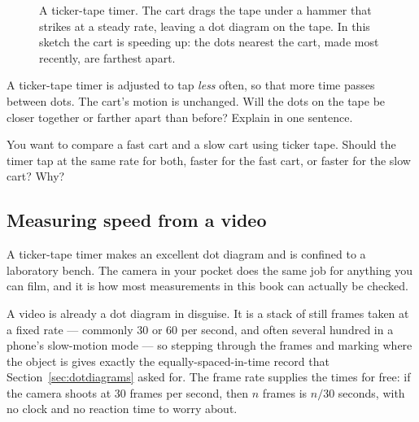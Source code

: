 \documentclass[11pt,twoside,openany]{book}
\newcounter{check}[chapter]
\begin{document}
\begin{figure}[htb]
\centering
{}
\caption{A ticker-tape timer. The cart drags the tape under a hammer that strikes at a steady rate, leaving a dot diagram on the tape. In this sketch the cart is speeding up: the dots nearest the cart, made most recently, are farthest apart.}
\label{fig:ticker}
\end{figure}

\begin{checkbox}
A ticker-tape timer is adjusted to tap \emph{less} often, so that more time passes between dots. The cart's motion is unchanged. Will the dots on the tape be closer together or farther apart than before? Explain in one sentence.
\end{checkbox}

\begin{checkbox}
You want to compare a fast cart and a slow cart using ticker tape. Should the timer tap at the same rate for both, faster for the fast cart, or faster for the slow cart? Why?
\end{checkbox}

\subsection{Measuring speed from a video}
\label{sec:video}

A ticker-tape timer makes an excellent dot diagram and is confined to a laboratory bench. The camera in your pocket does the same job for anything you can film, and it is how most measurements in this book can actually be checked.

A video is already a dot diagram in disguise. It is a stack of still frames taken at a fixed rate --- commonly \num{30} or \num{60} per second, and often several hundred in a phone's slow-motion mode --- so stepping through the frames and marking where the object is gives exactly the equally-spaced-in-time record that Section~\ref{sec:dotdiagrams} asked for. The frame rate supplies the times for free: if the camera shoots at \num{30} frames per second, then $n$ frames is $n/30$ seconds, with no clock and no reaction time to worry about.
\end{document}
